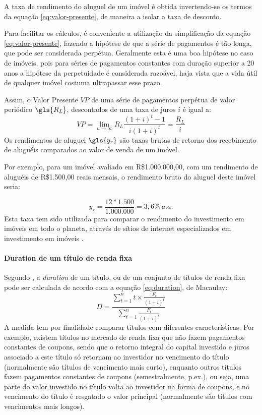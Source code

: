 \documentclass[
	12pt,				%
	oneside,			%
	a4paper,			%
	chapter=TITLE,		%
	section=TITLE,		%
	english,			%
	brazil				%
	]{abntex2}
\begin{document}
\begin{refsection}
A taxa de rendimento do aluguel de um imóvel é obtida invertendo-se os termos
da equação \eqref{eq:valor-presente}, de maneira a isolar a taxa de desconto.

Para facilitar os cálculos, é conveniente a utilização da simplificação da
equação \eqref{eq:valor-presente}, fazendo a hipótese de que a série de
pagamentos é tão longa, que pode ser considerada perpétua. Geralmente esta é
uma boa hipótese no caso de imóveis, pois para séries de pagamentos constantes
com duração superior a 20 anos a hipótese da perpetuidade é considerada razoável,
haja vista que a vida útil de qualquer imóvel costuma ultrapassar esse prazo.

Assim, o Valor Presente \(VP\) de uma série de pagamentos perpétua de valor
periódico \(\gls{R_L}\), descontados de uma taxa de juros \(i\) é igual a:
\begin{equation}
VP = \lim_{n \to \infty} R_L \frac{(1+i)^t-1}{i(1+i)^t}= \frac{R_L}{i}
\label{eq:perpetua}
\end{equation}
Os rendimentos de aluguel \(\gls{y_r}\) são taxas brutas de retorno dos
recebimento de aluguéis comparados ao valor de venda de um imóvel.

Por exemplo, para um imóvel avaliado em R\$1.000.000,00, com um rendimento de
aluguéis de R\$1.500,00 reais mensais, o rendimento bruto do aluguel
deste imóvel seria:

\[y_r = \frac{12*1.500}{1.000.000} = 3,6\% \ a.a.\]
Esta taxa tem sido utilizada para comparar o rendimento do investimento em
imóveis em todo o planeta, através de sítios de internet especializados em
investimento em imóveis \autocite{gpg}.

\hypertarget{duration-de-um-tuxedtulo-de-renda-fixa}{%
\paragraph{Duration de um título de renda fixa}\label{duration-de-um-tuxedtulo-de-renda-fixa}}

Segundo \textcite{marins1}, a \emph{duration} de um título, ou de um conjunto de títulos de
renda fixa pode ser calculada de acordo com a equação \eqref{eq:duration},
de Macaulay:
\begin{equation}
D = \frac{\sum\limits_{t = 1}^{n} t \times \frac{F_t}{(1+i)^t}}{\sum\limits_{t = 1}^{n} \frac{F_t}{(1+i)^t}}
\label{eq:duration}
\end{equation}
A medida tem por finalidade comparar títulos com diferentes características. Por
exemplo, existem títulos no mercado de renda fixa que não fazem pagamentos
constantes de coupons, sendo que o retorno integral do capital investido e juros
associado a este título só retornam ao investidor no vencimento do título
(normalmente são títulos de vencimento mais curto), enquanto outros títulos
fazem pagamentos constantes de coupons (semestralmente, p.ex.), ou seja,
uma parte do valor investido no título volta ao investidor na forma de coupons,
e no vencimento do título é resgatado o valor principal (normalmente são títulos
com vencimentos mais longos).


\end{refsection}
\end{document}
